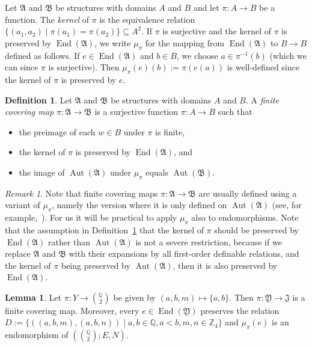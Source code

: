 \documentclass{amsart}
\theoremstyle{definition}
\newtheorem{lemma}[theorem]{Lemma}
\newtheorem{definition}[theorem]{Definition}
\theoremstyle{remark}
\newtheorem{remark}[theorem]{Remark}
\numberwithin{equation}{section}
\newcommand{\mZ}{\mathbb Z}
\newcommand{\aut}{\operatorname{Aut}}
\newcommand{\en}{\operatorname{End}}
\newcommand{\upairs}{{{\mathbb Q}\choose 2}}
\newcommand{\john}{\mathfrak{J}}
\newcommand{\fa}{\mathfrak{A}}
\newcommand{\fb}{\mathfrak{B}}
\newcommand{\fy}{\mathfrak{Y}}
\newcommand{\fz}{\mathfrak{Z}}
\begin{document}
Let $\fa$ and $\fb$ be structures with domains $A$ and $B$
and let $\pi \colon A \to B$ be a function. 
The \emph{kernel} of $\pi$ is the equivalence relation $\{(a_1,a_2) \mid \pi(a_1) = \pi(a_2)\} \subseteq A^2$. 
If $\pi$ is surjective and the kernel of $\pi$ is preserved by $\en(\fa)$, we write $\mu_\pi$ for the mapping from 
$\en(\fa)$ to $B \to B$ defined as follows.
If $e \in \en(\fa)$ and $b \in B$, we choose $a \in \pi^{-1}(b)$ (which we can since $\pi$ is surjective). Then 
$\mu_\pi(e)(b) := \pi(e(a))$ is well-defined since the kernel of $\pi$ is preserved by $e$. 
%
\begin{definition}\label{def:cover}
    Let $\fa$ and $\fb$ be structures with domains $A$ and $B$.
    A \emph{finite covering map $\pi \colon \fa \to \fb$} is a 
    surjective function $\pi \colon A \to B$ such that 
\begin{itemize}
    \item the preimage of each $w \in B$ under $\pi$ is finite,
    \item  the kernel of $\pi$ is preserved by $\en(\fa)$, and
    \item the image of $\aut(\fa)$ under $\mu_\pi$ equals $\aut(\fb)$. 
\end{itemize}
\end{definition}


\begin{remark}
    Note that finite covering maps $\pi \colon \fa \to \fb$ are usually defined using a variant of $\mu_\pi$, namely the version where it is only defined on $\aut(\fa)$ (see, for example,~\cite{EvansIvanovMacpherson,bodirsky2021permutation}).
    For us it will be practical to apply $\mu_\pi$ also to endomorphisms. Note that the assumption in Definition~\ref{def:cover} that the kernel of $\pi$ should be preserved by $\en(\fa)$ rather than $\aut(\fa)$ is not a severe restriction, 
because if we replace $\fa$ and $\fb$ with their expansions by all first-order definable relations, and the kernel of $\pi$ being preserved by $\aut(\fa)$, then it is also preserved by $\en(\fa)$.
\end{remark}

\begin{lemma}\label{fin_cover}
    Let $\pi \colon Y \rightarrow \upairs$ be given by  $(a,b,m)\mapsto \{a,b\}$. Then $\pi \colon \fy \to \john$ is a finite covering map. 
    Moreover, 
    every $e \in \en(\fy)$ preserves the relation 
    $D:=\{((a,b,m),(a,b,n)) \mid a,b \in {\mathbb Q}, a<b, m,n \in \mZ_4\}$
    and $\mu_{\pi}(e)$ is an endomorphism of $(\upairs;E,N)$.
\end{lemma}
\end{document}
